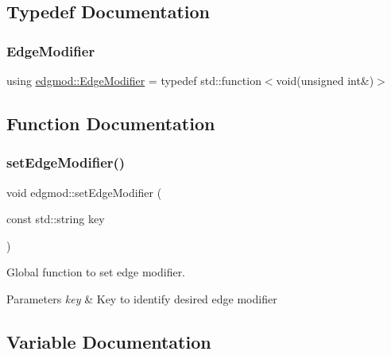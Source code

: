 \subsection{Typedef Documentation}
\mbox{\label{namespaceedgmod_abd975beb42f73310619eb134f62d7712}} 
\subsubsection{\texorpdfstring{Edge\+Modifier}{EdgeModifier}}
{\footnotesize\ttfamily using \hyperlink{namespaceedgmod_abd975beb42f73310619eb134f62d7712}{edgmod\+::\+Edge\+Modifier} = typedef std\+::function$<$void(unsigned int\&)$>$}



\subsection{Function Documentation}
\mbox{\label{namespaceedgmod_abf9bf9a87d7a5e31d233545b0e8a3c36}} 
\subsubsection{\texorpdfstring{set\+Edge\+Modifier()}{setEdgeModifier()}}
{\footnotesize\ttfamily void edgmod\+::set\+Edge\+Modifier (\begin{DoxyParamCaption}\item[{const std\+::string}]{key }\end{DoxyParamCaption})}



Global function to set edge modifier. 


\begin{DoxyParams}{Parameters}
{\em key} & Key to identify desired edge modifier \\
\hline
\end{DoxyParams}


\subsection{Variable Documentation}
\mbox{\label{namespaceedgmod_af31c90c50e8178bf4618a65e5252faff}} 
